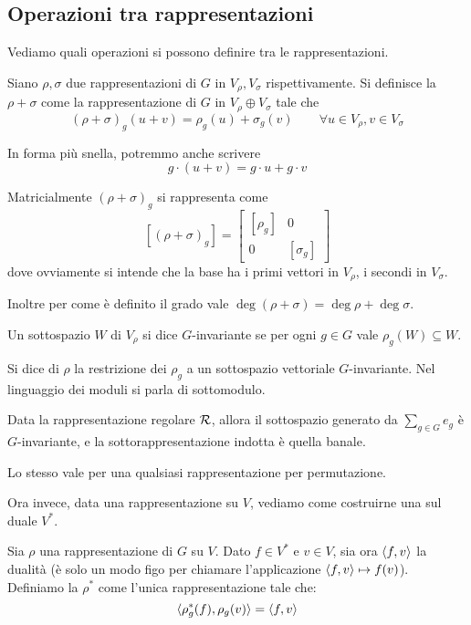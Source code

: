 	\subsection{Operazioni tra rappresentazioni}
	Vediamo quali operazioni si possono definire tra le rappresentazioni.

	\begin{mydef}
		Siano $\rho, \sigma$ due rappresentazioni di $G$ in $V_\rho,V_\sigma$ rispettivamente. Si definisce la  $\rho+\sigma$ come la rappresentazione di $G$ in $V_\rho\oplus V_\sigma$ tale che 
		\[
		(\rho+\sigma)_g(u+v)=\rho_g(u)+\sigma_g(v)\qquad \forall u\in V_\rho, v\in V_\sigma
		\]
		
		In forma più snella, potremmo anche scrivere
		\[
		 g\cdot(u+v) = g\cdot u + g\cdot v
		\]

	\end{mydef}

	Matricialmente $(\rho+\sigma)_g$ si rappresenta come
	\[
		[(\rho+\sigma)_g]=\left[
			\begin{array}{c|c}
				[\rho_g] & 0 \\
				\hline
				0 & [\sigma_g]
			\end{array}
		\right]
	\]
	dove ovviamente si intende che la base ha i primi vettori in $V_\rho$, i secondi in $V_\sigma$.

	Inoltre per come è definito il grado vale $\deg(\rho+\sigma)=\deg\rho+\deg\sigma$.

	\begin{mydef}
		Un sottospazio $W$ di $V_\rho$ si dice $G$-invariante se per ogni $g\in G$ vale $\rho_g(W)\subseteq W$.
	\end{mydef}

	\begin{mydef}
		Si dice  di $\rho$ la restrizione dei $\rho_g$ a un sottospazio vettoriale $G$-invariante. Nel linguaggio dei moduli si parla di sottomodulo.
	\end{mydef}

	\begin{myexample}
		Data la rappresentazione regolare $\mathcal R$, allora il sottospazio generato da $\sum_{g\in G} e_g$ è $G$-invariante, e la sottorappresentazione indotta è quella banale.
		
		Lo stesso vale per una qualsiasi rappresentazione per permutazione.
	\end{myexample}
			
	Ora invece, data una rappresentazione su $V$, vediamo come costruirne una sul duale $V^*$.
	\begin{mydef}
		Sia $\rho$ una rappresentazione di $G$ su $V$. Dato $f\in V^*$ e $v\in V$, sia ora $\langle f , v\rangle$ la dualità (è solo un modo figo per chiamare l'applicazione $\langle f , v\rangle \mapsto f(v)$). Definiamo la  $\rho^*$ come l'unica rappresentazione tale che:
		\[
		\langle\rho^*_g(f) , \rho_g (v)\rangle=\langle f , v\rangle
		\]
	\end{mydef}

